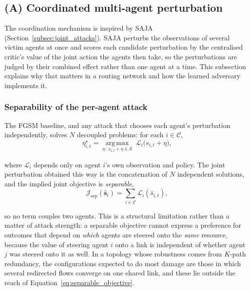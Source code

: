 \subsection{(A) Coordinated multi-agent perturbation}
\label{subsec:coordinated_attack}

The coordination mechanism is inspired by SAJA~\cite{guo2025sajastateactionjointattack}
(Section~\ref{subsec:joint_attacks}). SAJA perturbs the observations of several
victim agents at once and scores each candidate perturbation by the centralised
critic's value of the joint action the agents then take, so the perturbations are
judged by their combined effect rather than one agent at a time. This subsection
explains why that matters in a routing network and how the learned adversary implements
it.

\subsubsection*{Separability of the per-agent attack}

The FGSM baseline, and any attack that chooses each agent's perturbation independently,
solves $N$ decoupled problems: for each $i \in \mathcal{C}$,
\begin{equation}
  \eta_{i,t}^{\star} = \operatorname*{arg\,max}_{\eta \,:\, s_{i,t} + \eta \in \mathcal{S}}
  \; \mathcal{L}_{i}\big(s_{i,t} + \eta\big),
  \label{eq:separable_attack}
\end{equation}

\noindent where $\mathcal{L}_i$ depends only on agent $i$'s own observation and
policy. The joint perturbation obtained this way is the concatenation of $N$
independent solutions, and the implied joint objective is \emph{separable},
\begin{equation}
  \mathcal{J}_{\text{sep}}(\hat{\mathbf{s}}_t)
  = \sum_{i \in \mathcal{C}} \mathcal{L}_i(\hat{s}_{i,t}),
  \label{eq:separable_objective}
\end{equation}

\noindent so no term couples two agents. This is a structural limitation rather
than a matter of attack strength: a separable objective cannot express a preference
for outcomes that depend on \emph{which} agents are steered onto the \emph{same}
resource, because the value of steering agent $i$ onto a link is independent of
whether agent $j$ was steered onto it as well. In a topology whose robustness comes
from $K$-path redundancy, the configurations expected to do most damage are those in
which several redirected flows converge on one shared link, and these lie outside the
reach of Equation~\eqref{eq:separable_objective}.

